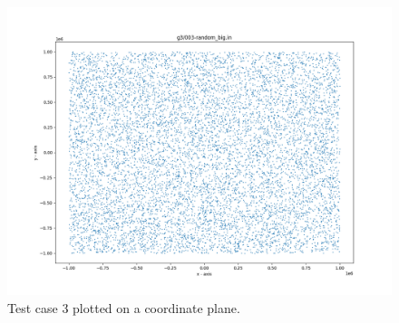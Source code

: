 \documentclass{article}
\begin{document}
\begin{appendices}
\begin{figure}[H]
	\label{fig:02}
\end{figure}
\begin{figure}[H]
	\centering
	\includegraphics[scale=0.4]{code/visualizer/testdata/03.png}
	\caption{Test case 3 plotted on a coordinate plane.}
	\label{fig:03}
\end{figure}
\begin{figure}[H]
	\centering

\end{figure}
\end{appendices}
\end{document}
